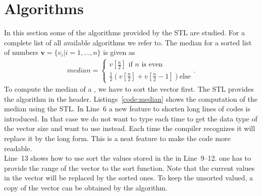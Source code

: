 \section{Algorithms}
\label{sec:stl:algorithms}
In this section some of the algorithms provided by the STL are studied. For a complete list of all available algorithms we refer to. The median for a sorted list of numbers $\mathbf{v}=\{v_i \vert i =1,\ldots,n\}$ is given as
\begin{align}
median = \begin{cases}
v[\frac{n}{2}] \text{ if } n \text{ is even} \\
\frac{1}{2}\left( v[\frac{n}{2}] + v[\frac{n}{2}-1] \right) \text{else}
\end{cases} \text{.}
\end{align}
To compute the median of a , we have to sort the vector first. The STL provides the  algorithm in the  header. Listings~\ref{code:median} shows the computation of the median using the STL. In Line~6 a new feature  to shorten long lines of codes is introduced. In that case we do not want to type each time  to get the data type of the vector size and want to use  instead. Each time the compiler recognizes  it will replace it by the long form. This is a neat feature to make the code more readable.\\

Line~13 shows how to use sort the values stored in the  in Line~9--12. one has to provide the range of the vector to the sort function. Note that the current values in the vector will be replaced by the sorted ones. To keep the unsorted valued, a copy of the vector can be obtained by the  algorithm.\\



